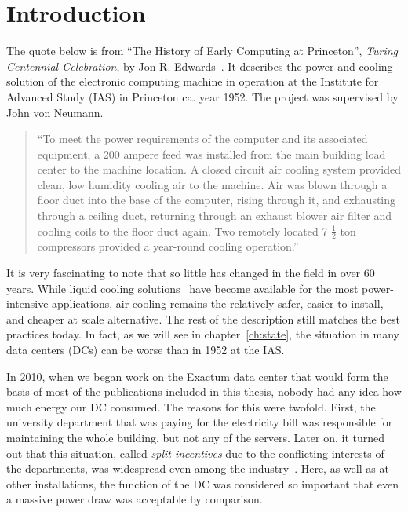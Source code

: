 \documentclass[officiallayout]{tktla}
\begin{document}
\mainmatter


\chapter{Introduction}
\label{ch:intro}

The quote below is from ``The History of Early Computing at Princeton'',
\emph{Turing Centennial Celebration}, by Jon R. Edwards~\cite{Edwards2012}. It
describes the power and cooling solution of the electronic computing machine
in operation at the Institute for Advanced Study (IAS) in Princeton ca. year
1952.  The project was supervised by John von Neumann.

\begin{quote}
``To meet the power requirements of the computer and its associated equipment,
a 200 ampere feed was installed from the main building load center to the
machine location. A closed circuit air cooling system provided clean, low
humidity cooling air to the machine. Air was blown through a floor duct into
the base of the computer, rising through it, and exhausting through a ceiling
duct, returning through an exhaust blower air filter and cooling coils to the
floor duct again. Two remotely located 7 $\frac{1}{2}$ ton compressors
provided a year-round cooling operation.''
\end{quote}

It is very fascinating to note that so little has changed in the field in over
60 years. While liquid cooling solutions~\cite{Meijer2010} have become
available for the most power-intensive applications, air cooling remains the
relatively safer, easier to install, and cheaper at scale alternative. The
rest of the description still matches the best practices today. In fact, as we
will see in chapter~\ref{ch:state}, the situation in many data centers (DCs)
can be worse than in 1952 at the IAS.

In 2010, when we began work on the Exactum data center that would form the
basis of most of the publications included in this thesis, nobody had any idea
how much energy our DC consumed.  The reasons for this were twofold. First,
the university department that was paying for the electricity bill was
responsible for maintaining the whole building, but not any of the servers.
Later on, it turned out that this situation, called \emph{split incentives}
due to the conflicting interests of the departments, was widespread even among
the industry~\cite{EPA2007,Koomey2012a,Webb2008,Stansberry2012}. Here, as well
as at other installations, the function of the DC was considered so important
that even a massive power draw was acceptable by comparison.
\end{document}
